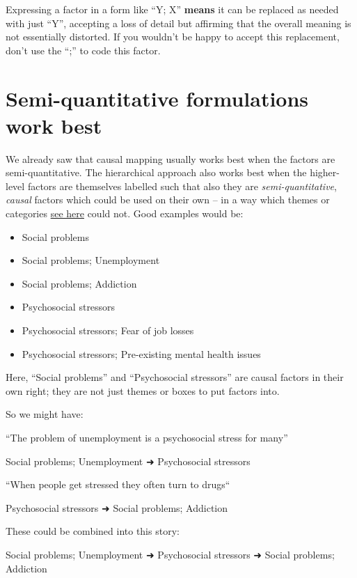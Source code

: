 \documentclass[
]{book}
\begin{document}
Expressing a factor in a form like ``Y; X'' \textbf{means} it can be replaced as needed with just ``Y'', accepting a loss of detail but affirming that the overall meaning is not essentially distorted. If you wouldn't be happy to accept this replacement, don't use the ``;'' to code this factor.

\hypertarget{semi-quantitative-formulations-work-best}{%
\section{Semi-quantitative formulations work best}\label{semi-quantitative-formulations-work-best}}

We already saw that causal mapping usually works best when the factors are semi-quantitative. The hierarchical approach also works best when the higher-level factors are themselves labelled such that also they are \emph{semi-quantitative}, \emph{causal} factors which could be used on their own -- in a way which themes or categories \protect\hyperlink{formulating-labels-semi-quantitative-factors}{see here} could not. Good examples would be:

\begin{itemize}
\item
  Social problems
\item
  Social problems; Unemployment
\item
  Social problems; Addiction
\item
  Psychosocial stressors
\item
  Psychosocial stressors; Fear of job losses
\item
  Psychosocial stressors; Pre-existing mental health issues
\end{itemize}

Here, ``Social problems'' and ``Psychosocial stressors'' are causal factors in their own right; they are not just themes or boxes to put factors into.

So we might have:

``The problem of unemployment is a psychosocial stress for many''

Social problems; Unemployment ➜ Psychosocial stressors

``When people get stressed they often turn to drugs``

Psychosocial stressors ➜ Social problems; Addiction

These could be combined into this story:

Social problems; Unemployment ➜ Psychosocial stressors ➜ Social problems; Addiction
\end{document}
